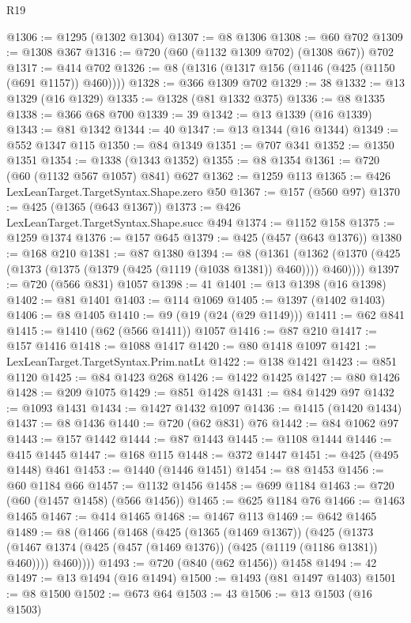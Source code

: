 \begin{lexlean}{R19}
\begin{coremodule}
{{{{{{{{{{{{{{{{{{{{{{{{{{{{{{{{{{{{{{{{{{{{{{{{{{{{{{{{{{{{{{{{{{{{{{{{{{{{{{{{{{{{{{{@1306 := @1295 (@1302 @1304)
@1307 := @8 @1306
@1308 := @60 @702
@1309 := @1308 @367
@1316 := @720 (@60 (@1132 @1309 @702) (@1308 @67)) @702
@1317 := @414 @702
@1326 := @8 (@1316 (@1317 @156 (@1146 (@425 (@1150 (@691 @1157)) @460))))
@1328 := @366 @1309 @702
@1329 := 38
@1332 := @13 @1329 (@16 @1329)
@1335 := @1328 (@81 @1332 @375)
@1336 := @8 @1335
@1338 := @366 @68 @700
@1339 := 39
@1342 := @13 @1339 (@16 @1339)
@1343 := @81 @1342
@1344 := 40
@1347 := @13 @1344 (@16 @1344)
@1349 := @552 @1347 @115
@1350 := @84 @1349
@1351 := @707 @341
@1352 := @1350 @1351
@1354 := @1338 (@1343 @1352)
@1355 := @8 @1354
@1361 := @720 (@60 (@1132 @567 @1057) @841) @627
@1362 := @1259 @113
@1365 := @426 LexLeanTarget.TargetSyntax.Shape.zero @50
@1367 := @157 (@560 @97)
@1370 := @425 (@1365 (@643 @1367))
@1373 := @426 LexLeanTarget.TargetSyntax.Shape.succ @494
@1374 := @1152 @158
@1375 := @1259 @1374
@1376 := @157 @645
@1379 := @425 (@457 (@643 @1376))
@1380 := @168 @210
@1381 := @87 @1380
@1394 := @8
    (@1361 (@1362 (@1370 (@425 (@1373 (@1375 (@1379 (@425 (@1119 (@1038 @1381)) @460)))) @460))))
@1397 := @720 (@566 @831) @1057
@1398 := 41
@1401 := @13 @1398 (@16 @1398)
@1402 := @81 @1401
@1403 := @114 @1069
@1405 := @1397 (@1402 @1403)
@1406 := @8 @1405
@1410 := @9 (@19 (@24 (@29 @1149)))
@1411 := @62 @841
@1415 := @1410 (@62 (@566 @1411)) @1057
@1416 := @87 @210
@1417 := @157 @1416
@1418 := @1088 @1417
@1420 := @80 @1418 @1097
@1421 := LexLeanTarget.TargetSyntax.Prim.natLt
@1422 := @138 @1421
@1423 := @851 @1120
@1425 := @84 @1423 @268
@1426 := @1422 @1425
@1427 := @80 @1426
@1428 := @209 @1075
@1429 := @851 @1428
@1431 := @84 @1429 @97
@1432 := @1093 @1431
@1434 := @1427 @1432 @1097
@1436 := @1415 (@1420 @1434)
@1437 := @8 @1436
@1440 := @720 (@62 @831) @76
@1442 := @84 @1062 @97
@1443 := @157 @1442
@1444 := @87 @1443
@1445 := @1108 @1444
@1446 := @415 @1445
@1447 := @168 @115
@1448 := @372 @1447
@1451 := @425 (@495 @1448) @461
@1453 := @1440 (@1446 @1451)
@1454 := @8 @1453
@1456 := @60 @1184 @66
@1457 := @1132 @1456
@1458 := @699 @1184
@1463 := @720 (@60 (@1457 @1458) (@566 @1456))
@1465 := @625 @1184 @76
@1466 := @1463 @1465
@1467 := @414 @1465
@1468 := @1467 @113
@1469 := @642 @1465
@1489 := @8
    (@1466
      (@1468
        (@425
          (@1365 (@1469 @1367))
          (@425
            (@1373 (@1467 @1374 (@425 (@457 (@1469 @1376)) (@425 (@1119 (@1186 @1381)) @460))))
            @460))))
@1493 := @720 (@840 (@62 @1456)) @1458
@1494 := 42
@1497 := @13 @1494 (@16 @1494)
@1500 := @1493 (@81 @1497 @1403)
@1501 := @8 @1500
@1502 := @673 @64
@1503 := 43
@1506 := @13 @1503 (@16 @1503)
}}}}}}}}}}}}}}}}}}}}}}}}}}}}}}}}}}}}}}}}}}}}}}}}}}}}}}}}}}}}}}}}}}}}}}}}}}}}}}}}}}}}}}}
\end{coremodule}
\end{lexlean}
